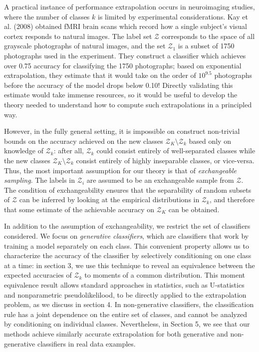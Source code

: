 \documentclass{article}
\begin{document}
A practical instance of performance extrapolation occurs in neuroimaging studies, where the number of classes $k$ is
limited by experimental considerations.
Kay et al. (2008) obtained fMRI brain scans which record how a single subject's visual cortex responds to natural images.
The label set $\mathcal{Z}$ corresponds to the space of all grayscale photographs of natural images,
and the set $\mathcal{Z}_1$ is a subset of 1750 photographs used in the experiment.
They construct a classifier which achieves over 0.75 accuracy for classifying the 1750 photographs;
based on exponential extrapolation, they estimate that it would take on the order of $10^{9.5}$ photographs
before the accuracy of the model drops below 0.10!  Directly validating this estimate would take immense resources,
so it would be useful to develop the theory needed to understand how to compute such extrapolations
in a principled way. 

However, in the fully general setting, it is impossible on construct
non-trivial bounds on the accuracy achieved on the new classes $\mathcal{Z}_K \setminus \mathcal{Z}_k$
based only on knowledge of $\mathcal{Z}_k$: after all, $\mathcal{Z}_k$ could consist entirely of well-separated classes
while the new classes $\mathcal{Z}_K \setminus \mathcal{Z}_k$ consist entirely of highly inseparable classes, or vice-versa.
Thus, the most important assumption for our theory is that of \emph{exchangeable sampling}.
The labels in $\mathcal{Z}_i$ are assumed to be an exchangeable sample from $\mathcal{Z}$.
The condition of exchangeability ensures that the separability of random subsets of $\mathcal{Z}$ can be inferred
by looking at the empirical distributions in $\mathcal{Z}_k$, and therefore that some estimate of the achievable
accuracy on $\mathcal{Z}_K$ can be obtained.

In addition to the assumption of exchangeability, we restrict the set of classifiers considered.
We focus on \emph{generative classifiers}, which are classifiers that work by training
a model separately on each class.  This convenient property 
allows us to characterize the accuracy of the classifier by selectively conditioning on one class at a time:
in section 3, we use this technique to reveal an equivalence between 
the expected accuracies of $\mathcal{Z}_k$ to moments of a common distribution.
This moment equivalence result allows standard approaches in statistics, such as U-statistics and
nonparametric pseudolikelilood, to be directly applied to the extrapolation problem, as we discuss in section 4.
In non-generative classifiers, the classification rule has a joint dependence on the entire set of classes,
and cannot be analyzed by conditioning on individual classes.
Nevertheless, in Section 5, we see that our methods achieve similarly accurate extrapolation for both
generative and non-generative classifiers in real data examples.
\end{document}
